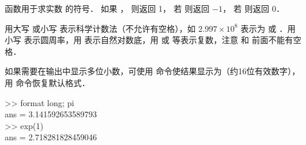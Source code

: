  函数用于求实数  的符号． 如果 ， 则返回 1， 若  则返回 $-1$， 若  则返回 0．

用大写  或小写  表示科学计数法（不允许有空格），如 $2.997\times 10^8$ 表示为  或 ．用小写  表示圆周率，用  表示自然对数底，用  或  等表示复数，注意  和  前面不能有空格．

如果需要在输出中显示多位小数，可使用  命令使结果显示为（约16位有效数字），用  命令恢复默认格式．
\begin{Command}
>> format {\color{string}long}; pi \\
ans = 3.141592653589793 \\
>> exp(1) \\
ans = 2.718281828459046
\end{Command}